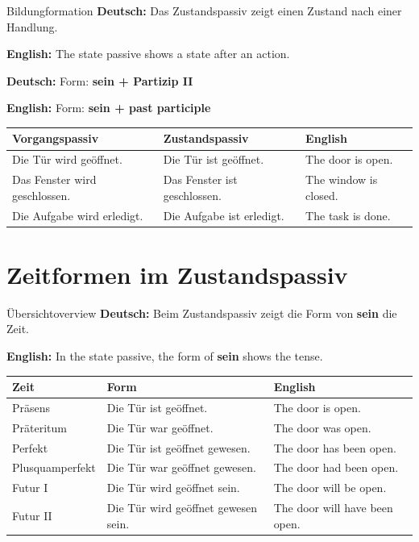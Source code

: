 \documentclass[a4paper,11pt]{article}
\newcommand{\GermanText}[1]{\textbf{Deutsch: }#1\par}
\newcommand{\EnglishText}[1]{{\small\color{SoftGray}\textbf{English: }#1\par}}
\begin{document}
\begin{grammarentry}{Bildung}{formation}
\GermanText{Das Zustandspassiv zeigt einen Zustand nach einer Handlung.}
\EnglishText{The state passive shows a state after an action.}

\GermanText{Form: \textbf{sein + Partizip II}}
\EnglishText{Form: \textbf{sein + past participle}}

\begin{center}
\begin{tabular}{lll}
\textbf{Vorgangspassiv} & \textbf{Zustandspassiv} & \textbf{English} \\
\hline
Die Tür wird geöffnet. & Die Tür ist geöffnet. & The door is open. \\
Das Fenster wird geschlossen. & Das Fenster ist geschlossen. & The window is closed. \\
Die Aufgabe wird erledigt. & Die Aufgabe ist erledigt. & The task is done. \\
\end{tabular}
\end{center}
\end{grammarentry}

\section{Zeitformen im Zustandspassiv}

\begin{grammarentry}{Übersicht}{overview}
\GermanText{Beim Zustandspassiv zeigt die Form von \textbf{sein} die Zeit.}
\EnglishText{In the state passive, the form of \textbf{sein} shows the tense.}

\begin{center}
\begin{tabular}{lll}
\textbf{Zeit} & \textbf{Form} & \textbf{English} \\
\hline
Präsens & Die Tür ist geöffnet. & The door is open. \\
Präteritum & Die Tür war geöffnet. & The door was open. \\
Perfekt & Die Tür ist geöffnet gewesen. & The door has been open. \\
Plusquamperfekt & Die Tür war geöffnet gewesen. & The door had been open. \\
Futur I & Die Tür wird geöffnet sein. & The door will be open. \\
Futur II & Die Tür wird geöffnet gewesen sein. & The door will have been open. \\
\end{tabular}
\end{center}
\end{grammarentry}
\end{document}
